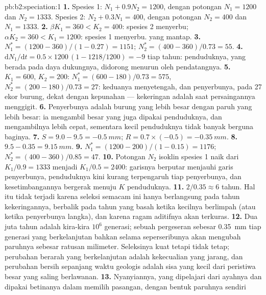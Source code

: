 \begin{solution}{pb:b2:speciation:1}
\textbf{1.} Spesies 1: $N_1 + 0.9N_2 = 1200$, dengan potongan $N_1 = 1200$
dan $N_2 = 1333$. Spesies 2: $N_2 + 0.3N_1 = 400$, dengan potongan $N_2 =
400$ dan $N_1 = 1333$.
\textbf{2.} $\beta K_1 = 360 < K_2 = 400$: spesies 2 menyerbu;
$\alpha K_2 = 360 < K_1 = 1200$: spesies 1 menyerbu.  yang mantap.
\textbf{3.} $N_1^{*} = (1200 - 360)/(1 - 0.27) = 1151$; $N_2^{*} =
(400 - 360)/0.73 = 55$.
\textbf{4.} $\mathrm{d}N_1/\mathrm{d}t = 0.5\times 1200\,(1 - 1218/1200)
= -9$ tiap tahun: penduduknya, yang berada pada daya dukungnya,
didorong menurun oleh pendatangnya.
\textbf{5.} $K_1 = 600$, $K_2 = 200$: $N_1^{*} = (600 - 180)/0.73 =
575$, $N_2^{*} = (200 - 180)/0.73 = 27$: keduanya menyetengah, dan
penyerbunya, pada 27 ekor burung, dekat dengan kepunahan --- kekeringan
adalah saat persaingannya menggigit.
\textbf{6.} Penyerbunya adalah burung yang lebih besar dengan paruh
yang lebih besar: ia mengambil  besar yang juga dipakai
penduduknya, dan mengambilnya lebih cepat, sementara  kecil
penduduknya tidak banyak berguna baginya.
\textbf{7.} $S = 9.0 - 9.5 = \qty{-0.5}{mm}$; $R = 0.7\times(-0.5) =
\qty{-0.35}{mm}$.
\textbf{8.} $9.5 - 0.35 = \qty{9.15}{mm}$.
\textbf{9.} $N_1^{*} = (1200 - 200)/(1 - 0.15) = 1176$; $N_2^{*} =
(400 - 360)/0.85 = 47$.
\textbf{10.} Potongan $N_2$ isoklin spesies 1 naik dari
$K_1/0.9 = 1333$ menjadi $K_1/0.5 = 2400$: garisnya berputar menjauhi
garis penyerbunya, penduduknya kini kurang terpengaruh tiap penyerbunya,
dan kesetimbangannya bergerak menuju $K$ penduduknya.
\textbf{11.} $2/0.35 \approx 6$ tahun. Hal itu tidak terjadi karena
seleksi semacam ini hanya berlangsung pada tahun kekeringannya,
berbalik pada tahun yang basah ketika  kecilnya berlimpah (atau
ketika penyerbunya langka), dan karena ragam aditifnya akan terkuras.
\textbf{12.} Dua juta tahun adalah kira-kira $10^{6}$ generasi; sebuah
pergeseran sebesar \qty{0.35}{mm} tiap generasi yang berkelanjutan
bahkan selama seperseribunya akan mengubah paruhnya sebesar ratusan
milimeter. Seleksinya kuat tetapi tidak tetap; perubahan berarah yang
berkelanjutan adalah kekecualian yang jarang, dan perubahan bersih
sepanjang waktu geologis adalah sisa yang kecil dari peristiwa besar
yang saling berlawanan.
\textbf{13.} Nyanyiannya, yang dipelajari dari ayahnya dan dipakai
betinanya dalam memilih pasangan, dengan bentuk paruhnya sendiri

\end{solution}
